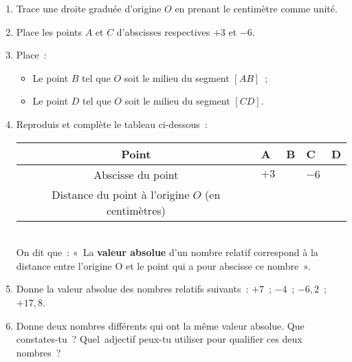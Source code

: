 
\begin{activite}[Opposés ?]

\begin{enumerate}
 \item Trace une droite graduée d'origine $O$ en prenant le centimètre comme unité.
 \item Place les points $A$ et $C$ d'abscisses respectives $+ 3$ et $- 6$.
 \item Place :
 \begin{itemize}
  \item Le point $B$ tel que $O$ soit le milieu du segment $[AB]$ ;
  \item Le point $D$ tel que $O$ soit le milieu du segment $[CD]$.
  \end{itemize}
 \item Reproduis et complète le tableau ci-dessous : \\[1em]
  \begin{tabularx}{\linewidth}{|c|X|X|X|X|}
   \hline
   \rowcolor{J2} Point & A & B & C & D \\\hline
   \rowcolor{J2} Abscisse du point & $+ 3$ & & $- 6$ & \\\hline
   \rowcolor{J2} Distance du point à l'origine $O$ (en centimètres) & & & & \\\hline
   \end{tabularx} \\[1em]
  On dit que : « La \textbf{valeur absolue} d'un nombre relatif correspond à la distance entre l'origine O et le point qui a pour abscisse ce nombre ». 

 \item Donne la valeur absolue des nombres relatifs suivants : $+ 7$ ; $- 4$ ; $- 6,2$ ; $+ 17,8$.
 \item Donne deux nombres différents qui ont la même valeur absolue. Que constates-tu ? Quel adjectif peux-tu utiliser pour qualifier ces deux nombres ?
 \end{enumerate}
 
\end{activite}


